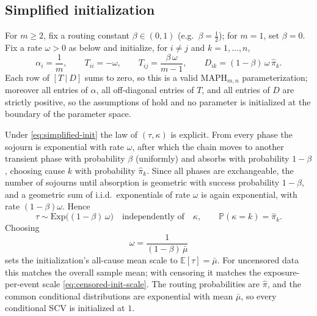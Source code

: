 \documentclass{article}
\newcommand{\Prob}{\mathbb{P}}
\newcommand{\ex}[1]{\mathbb{E}\left[#1\right]}
\newenvironment{rcrevision}{}{}
\newcommand{\subchg}[1]{#1}
\begin{document}
\subsection{Simplified initialization}
\label{sec:init-simplified}

\begin{rcrevision}
For $m\ge2$, fix a routing constant $\beta\in(0,1)$ (e.g.\ $\beta=\tfrac12$); for $m=1$, set $\beta=0$. Fix a rate $\omega>0$ as below and initialize, for $i\ne j$ and $k=1,\ldots,n$,
\end{rcrevision}
\begin{equation}
\label{eq:simplified-init}
\alpha_i = \frac{1}{m},
\qquad
T_{ii} = -\omega,
\qquad
T_{ij} = \frac{\beta\,\omega}{m-1},
\qquad
D_{ik} = (1-\beta)\,\omega\,\hat{\pi}_k.
\end{equation}
Each row of $[T ~\vert~ D]$ sums to zero, so this is a valid $\text{MAPH}_{m,n}$ parameterization; moreover all entries of $\alpha$, all off-diagonal entries of $T$, and all entries of $D$ are strictly positive, so \subchg{the assumptions of  hold} and no parameter is initialized at the boundary of the parameter space.

Under \eqref{eq:simplified-init} the law of $(\tau,\kappa)$ is explicit. From every phase the sojourn is exponential with rate $\omega$, after which the chain moves to another transient phase with probability $\beta$ (uniformly) and absorbs with probability $1-\beta$, choosing cause $k$ with probability $\hat{\pi}_k$. Since all phases are exchangeable, the number of sojourns until absorption is geometric with success probability $1-\beta$, and a geometric sum of i.i.d.\ exponentials of rate $\omega$ is again exponential, with rate $(1-\beta)\omega$. Hence
\[
\tau \sim \mathrm{Exp}\big((1-\beta)\,\omega\big)
\quad \text{independently of} \quad \kappa,
\qquad
\Prob(\kappa = k) = \hat{\pi}_k.
\]
Choosing
\begin{equation}
\label{eq:omega-simplified}
\omega = \frac{1}{(1-\beta)\,\bar{\mu}}
\end{equation}
\begin{rcrevision}
sets the initialization's all-cause mean scale to $\ex{\tau}=\bar\mu$. For uncensored data this matches the overall sample mean; with censoring it matches the exposure-per-event scale \eqref{eq:censored-init-scale}. The routing probabilities are $\hat\pi$, and the common conditional distributions are exponential with mean $\bar\mu$, so every conditional SCV is initialized at $1$.
\end{rcrevision}
\end{document}

